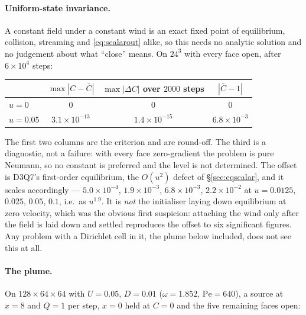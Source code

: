 \documentclass[11pt,a4paper]{article}
\begin{document}
\paragraph{Uniform-state invariance.} A constant field under a constant wind is
an exact fixed point of equilibrium, collision, streaming and
\eqref{eq:scalarout} alike, so this needs no analytic solution and no judgement
about what ``close'' means. On $24^3$ with every face open, after $6\times10^4$
steps:
\begin{center}
\begin{tabular}{lccc}
\toprule
 & $\max|C-\bar{C}|$ & $\max|\Delta C|$ over $2000$ steps & $|\bar{C}-1|$ \\
\midrule
$u=0$    & $0$ & $0$ & $0$ \\
$u=0.05$ & $3.1\times10^{-13}$ & $1.4\times10^{-15}$ & $6.8\times10^{-3}$ \\
\bottomrule
\end{tabular}
\end{center}

\noindent The first two columns are the criterion and are round-off. The third
is a diagnostic, not a failure: with every face zero-gradient the problem is
pure Neumann, so no constant is preferred and the level is not determined. The
offset is D3Q7's first-order equilibrium, the $O(u^2)$ defect of
\S\ref{sec:eqscalar}, and it scales accordingly --- $5.0\times10^{-4}$,
$1.9\times10^{-3}$, $6.8\times10^{-3}$, $2.2\times10^{-2}$ at $u=0.0125$,
$0.025$, $0.05$, $0.1$, i.e.\ as $u^{1.9}$. It is \emph{not} the initialiser
laying down equilibrium at zero velocity, which was the obvious first
suspicion: attaching the wind only after the field is laid down and settled
reproduces the offset to six significant figures. Any problem with a Dirichlet
cell in it, the plume below included, does not see this at all.

\paragraph{The plume.} On $128\times64\times64$ with $U=0.05$, $D=0.01$
($\omega=1.852$, $\mathrm{Pe}=640$), a source at $x=8$ and $Q=1$ per step,
$x=0$ held at $C=0$ and the five remaining faces open:
\end{document}

